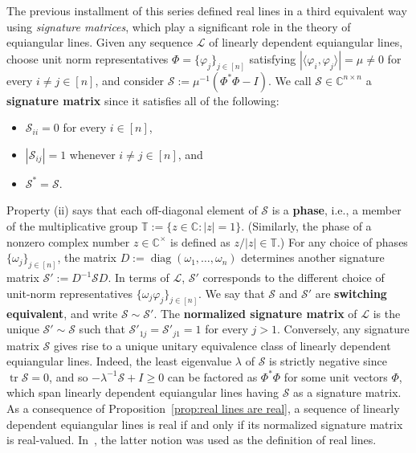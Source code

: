 \documentclass[11pt]{article}
\theoremstyle{definition}
\numberwithin{equation}{section}
\begin{document}
The previous installment of this series defined real lines in a third equivalent way using \textit{signature matrices}, which play a significant role in the theory of equiangular lines.
Given any sequence $\mathscr{L}$ of linearly dependent equiangular lines, choose unit norm representatives $\Phi = \{ \varphi_j \}_{j\in [n]}$ satisfying $ | \langle \varphi_i, \varphi_j \rangle | = \mu \neq 0$ for every $i \neq j \in [n]$, and consider $\mathcal{S} := \mu^{-1}(\Phi^*\Phi - I)$.
We call $\mathcal{S} \in \mathbb{C}^{n \times n}$ a \textbf{signature matrix} since it satisfies all of the following:
\begin{itemize}
\item[(i)]
$\mathcal{S}_{ii} = 0$ for every $i \in [n]$,
\item[(ii)]
$| \mathcal{S}_{ij} | = 1$ whenever $i \neq j \in [n]$, and
\item[(iii)]
$\mathcal{S}^* = \mathcal{S}$.
\end{itemize}
Property (ii) says that each off-diagonal element of $\mathcal{S}$ is a \textbf{phase}, i.e., a member of the multiplicative group $\mathbb{T}:=\{ z \in \mathbb{C} : |z| = 1\}$.
(Similarly, the phase of a nonzero complex number $z \in \mathbb{C}^\times$ is defined as $z/|z| \in \mathbb{T}$.)
For any choice of phases $\{ \omega_j \}_{j \in [n]}$, the matrix $D := \operatorname{diag}(\omega_1,\dotsc,\omega_n)$ determines another signature matrix $\mathcal{S}' := D^{-1} \mathcal{S} D$.
In terms of $\mathscr{L}$, $\mathcal{S}'$ corresponds to the different choice of unit-norm representatives $\{ \omega_j \varphi_j \}_{j \in [n]}$.
We say that $\mathcal{S}$ and $\mathcal{S}'$ are \textbf{switching equivalent}, and write $\mathcal{S} \sim \mathcal{S}'$.
The \textbf{normalized signature matrix} of $\mathscr{L}$ is the unique $\mathcal{S}' \sim \mathcal{S}$ such that $\mathcal{S}'_{1j} =  \mathcal{S}'_{j1} = 1$ for every $j > 1$.
Conversely, any signature matrix $\mathcal{S}$ gives rise to a unique unitary equivalence class of linearly dependent equiangular lines.
Indeed, the least eigenvalue $\lambda$ of $\mathcal{S}$ is strictly negative since $\operatorname{tr} \mathcal{S} = 0$, and so $-\lambda^{-1} \mathcal{S} + I \geq 0$ can be factored as $\Phi^*\Phi$ for some unit vectors $\Phi$, which span linearly dependent equiangular lines having $\mathcal{S}$ as a signature matrix.
As a consequence of Proposition~\ref{prop:real lines are real}, a sequence of linearly dependent equiangular lines is real if and only if its normalized signature matrix is real-valued.
In~\cite{IversonM:18}, the latter notion was used as the definition of real lines.
\end{document}
